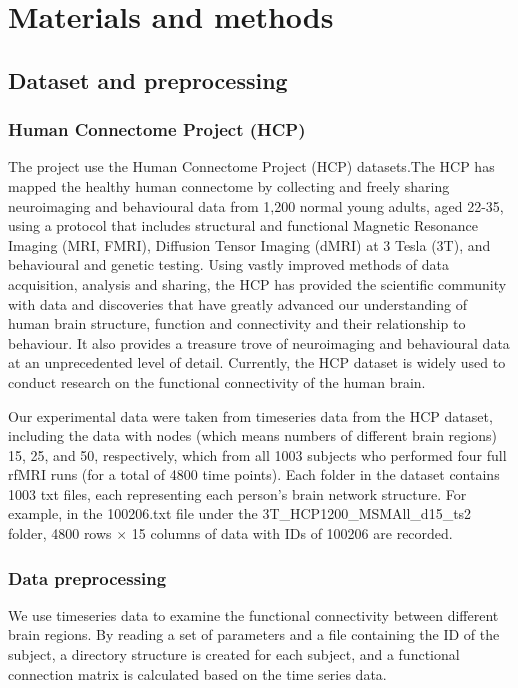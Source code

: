 \documentclass[11pt]{article}
\begin{document}
\section{Materials and methods}

\subsection{Dataset and preprocessing}

\subsubsection{Human Connectome Project (HCP)}

The project use the Human Connectome Project (HCP) datasets.The HCP has mapped the healthy human connectome by collecting and freely sharing neuroimaging and behavioural data from 1,200 normal young adults, aged 22-35, using a protocol that includes structural and functional Magnetic Resonance Imaging (MRI, FMRI), Diffusion Tensor Imaging (dMRI) at 3 Tesla (3T), and behavioural and genetic testing. Using vastly improved methods of data acquisition, analysis and sharing, the HCP has provided the scientific community with data and discoveries that have greatly advanced our understanding of human brain structure, function and connectivity and their relationship to behaviour. It also provides a treasure trove of neuroimaging and behavioural data at an unprecedented level of detail. Currently, the HCP dataset is widely used to conduct research on the functional connectivity of the human brain.

Our experimental data were taken from timeseries data from the HCP dataset,  including the data with nodes (which means numbers of different brain regions) 15, 25, and 50, respectively, which from all 1003 subjects who performed four full rfMRI runs (for a total of 4800 time points). Each folder in the dataset contains 1003 txt files, each representing each person's brain network structure. For example, in the 100206.txt file under the 3T\_HCP1200\_MSMAll\_d15\_ts2 folder, 4800 rows $\times$ 15 columns of data with IDs of 100206 are recorded.

\subsubsection{Data preprocessing}

We use timeseries data to examine the functional connectivity between different brain regions. By reading a set of parameters and a file containing the ID of the subject, a directory structure is created for each subject, and a functional connection matrix is calculated based on the time series data.
\end{document}
